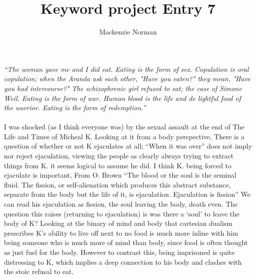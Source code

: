 \documentclass{article}
\title{Keyword project Entry 7}
\author{Mackenzie Norman}
\begin{document}
\maketitle 
\textit{``The woman gave me and I did eat. Eating is the form of sex. Copulation is oral copulation; when the Aranda ask each other, "Have you eaten?" they mean, "Have you had intercourse?" The schizophrenic girl refused to eat; the case of Simone Weil. Eating is the form of war. Human blood is the life and de lightful food of the warrior. Eating is the form of redemption.''}
\paragraph{}

I was shocked (as I think everyone was) by the sexual assault at the end of The Life and Times of Micheal K. Looking at it from a body perspective, There is a question of whether or not K ejaculates at all; ``When it was over'' does not imply nor reject ejaculation, viewing the people as clearly always trying to extract things from K. it seems logical to assume he did.  I think K. being forced to ejaculate is important, From O. Brown ``The blood or the soul is the seminal fluid. The fission, or self-alienation which produces this abstract substance, separate from the body but the life of it, is ejaculation. Ejaculation is fission'' We can read his ejaculation as fission, the soul leaving the body, death even. The question this raises (returning to ejaculation) is was there a `soul' to leave the body of K? Looking at the binary of mind and body that cartesian dualism prescribes K's ability to live off next to no food is much more inline with him being someone who is much more of mind than body, since food is often thought as just fuel for the body. However to contrast this, being imprisoned is quite distressing to K, which implies a deep connection to his body and clashes with the stoic refusal to eat.
\end{document}

